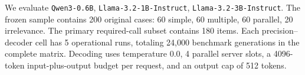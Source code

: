 We evaluate \texttt{Qwen3-0.6B}, \texttt{Llama-3.2-1B-Instruct}, \texttt{Llama-3.2-3B-Instruct}. The frozen sample contains 200 original cases: 60 simple, 60 multiple, 60 parallel, 20 irrelevance. The primary required-call subset contains 180 items. Each precision--decoder cell has 5 operational runs, totaling 24,000 benchmark generations in the complete matrix. Decoding uses temperature 0.0, 4 parallel server slots, a 4096-token input-plus-output budget per request, and an output cap of 512 tokens.

